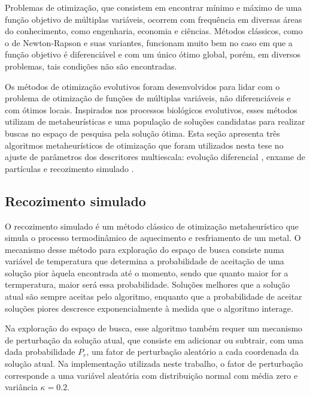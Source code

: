 Problemas de otimização, que consistem em encontrar mínimo e máximo de uma função objetivo de múltiplas variáveis, ocorrem com frequência em diversas áreas do conhecimento, como engenharia, economia e ciências. Métodos clássicos, como o de Newton-Rapson e suas variantes, funcionam muito bem no caso em que a função objetivo é diferenciável e com um único ótimo global, porém, em diversos problemas, tais condições não são encontradas. 

Os métodos de otimização evolutivos foram desenvolvidos para lidar com o problema de otimização de funções de múltiplas  variáveis, não diferenciáveis e com ótimos locais. Inspirados nos processos biológicos evolutivos, esses métodos utilizam de metaheurísticas e uma população de soluções candidatas para realizar buscas no espaço de pesquisa pela solução ótima. Esta seção apresenta três algoritmos metaheurísticos de otimização que foram utilizados nesta tese no ajuste de parâmetros dos descritores multiescala: evolução diferencial  \cite{Storn:1007}, enxame de partículas  \cite{Yuhui:1998} e recozimento simulado \cite{Andries:2007}.

\subsection{Recozimento simulado}

O  recozimento simulado é um método clássico de otimização metaheurístico que simula o processo termodinâmico de aquecimento e resfriamento de um metal. O mecanismo desse método para exploração do espaço de busca consiste numa variável de temperatura que determina a probabilidade de aceitação de uma solução pior àquela encontrada até o momento, sendo que quanto maior for a termperatura, maior será essa probabilidade. Soluções melhores que a solução atual são sempre aceitas pelo algoritmo, enquanto que a probabilidade de aceitar soluções piores descresce exponencialmente à medida que o algoritmo interage.  

Na exploração do espaço de busca, esse algoritmo também requer um mecanismo de perturbação da solução atual, que consiste em adicionar ou subtrair, com uma dada probabilidade $P_r$, um fator de perturbação aleatório a cada coordenada da solução atual. Na implementação utilizada neste trabalho, o fator de perturbação corresponde a uma variável aleatória com distribuição normal com média zero e variância $\kappa = 0.2$.

